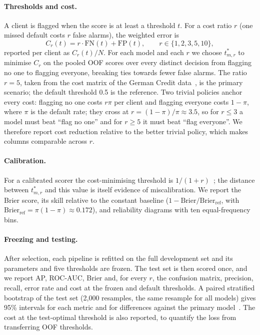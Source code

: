 \documentclass{article}
\newcommand{\FN}{\mathrm{FN}}
\newcommand{\FP}{\mathrm{FP}}
\begin{document}
\paragraph{Thresholds and cost.} A client is flagged when the score is at least a threshold $t$. For a cost ratio $r$ (one missed default costs $r$ false alarms), the weighted error is
\begin{equation}
  C_r(t) = r\cdot\FN(t) + \FP(t), \qquad r\in\{1,2,3,5,10\},
  \label{eq:cost}
\end{equation}
reported per client as $C_r(t)/N$. For each model and each $r$ we choose $t^\ast_{m,r}$ to minimise $C_r$ on the pooled OOF scores over every distinct decision from flagging no one to flagging everyone, breaking ties towards fewer false alarms. The ratio $r=5$, taken from the cost matrix of the German Credit data~\citep{german_credit}, is the primary scenario; the default threshold 0.5 is the reference. Two trivial policies anchor every cost: flagging no one costs $r\pi$ per client and flagging everyone costs $1-\pi$, where $\pi$ is the default rate; they cross at $r=(1-\pi)/\pi\approx3.5$, so for $r\le3$ a model must beat ``flag no one'' and for $r\ge5$ it must beat ``flag everyone''. We therefore report cost reduction relative to the better trivial policy, which makes columns comparable across $r$.

\paragraph{Calibration.} For a calibrated scorer the cost-minimising threshold is $1/(1+r)$~\citep{elkan2001foundations}; the distance between $t^\ast_{m,r}$ and this value is itself evidence of miscalibration. We report the Brier score, its skill relative to the constant baseline ($1-\mathrm{Brier}/\mathrm{Brier}_{\mathrm{ref}}$, with $\mathrm{Brier}_{\mathrm{ref}}=\pi(1-\pi)\approx0.172$), and reliability diagrams with ten equal-frequency bins.

\paragraph{Freezing and testing.} After selection, each pipeline is refitted on the full development set and its parameters and five thresholds are frozen. The test set is then scored once, and we report AP, ROC-AUC, Brier and, for every $r$, the confusion matrix, precision, recall, error rate and cost at the frozen and default thresholds. A paired stratified bootstrap of the test set (2{,}000 resamples, the same resample for all models) gives 95\% intervals for each metric and for differences against the primary model~\citep{efron1994introduction}. The cost at the test-optimal threshold is also reported, to quantify the loss from transferring OOF thresholds.
\end{document}
